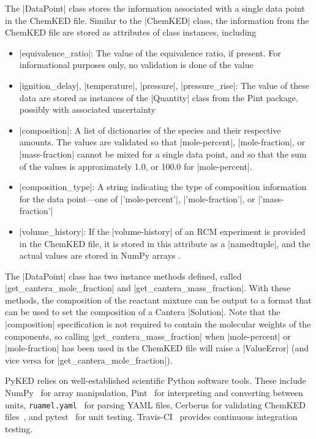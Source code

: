 \documentclass[12pt]{ussci}
\newcommand\ck{ChemKED}
\newcommand\pk{PyKED}
\begin{document}
The \python|DataPoint| class stores the information associated with a single
data point in the \ck{} file. Similar to the \python|ChemKED| class, the
information from the \ck{} file are stored as attributes of class instances,
including
%
\begin{itemize}
    \item \python|equivalence_ratio|: The value of the equivalence ratio, if
    present. For informational purposes only, no validation is done of the value
    \item \python|ignition_delay|, \python|temperature|, \python|pressure|,
    \python|pressure_rise|: The value of these data are stored as instances of
    the \python|Quantity| class from the Pint \autocite{Grecco2016} package,
    possibly with associated uncertainty
    \item \python|composition|: A list of dictionaries of the species and their
    respective amounts. The values are validated so that \yaml|mole-percent|,
    \yaml|mole-fraction|, or \yaml|mass-fraction| cannot be mixed for a single
    data point, and so that the sum of the values is approximately 1.0, or
    100.0 for \yaml|mole-percent|.
    \item \python|composition_type|: A string indicating the type of composition
    information for the data point---one of \python|'mole-percent'|,
    \python|'mole-fraction'|, or \python|'mass-fraction'|
    \item \python|volume_history|: If the \yaml|volume-history| of an RCM
    experiment is provided in the \ck{} file, it is stored in this attribute as
    a \python|namedtuple|, and the actual values are stored in NumPy arrays
    \autocite{vanderWalt:2011np}.
\end{itemize}

The \python|DataPoint| class has two instance methods defined, called
\python|get_cantera_mole_fraction| and \python|get_cantera_mass_fraction|. With
these methods, the composition of the reactant mixture can be output to a format
that can be used to set the composition of a Cantera \python|Solution|. Note
that the \python|composition| specification is not required to contain the
molecular weights of the components, so calling
\python|get_cantera_mass_fraction| when \yaml|mole-percent| or
\yaml|mole-fraction| has been used in the \ck{} file will raise a
\python|ValueError| (and vice versa for \python|get_cantera_mole_fraction|).

\pk{} relies on well-established scientific Python software tools. These include
NumPy~\autocite{vanderWalt:2011np} for array manipulation,
Pint~\autocite{Grecco2016} for interpreting and converting between units,
\texttt{ruamel.yaml}~\autocite{ruamel_yaml} for parsing YAML files, Cerberus for
validating \ck{} files~\autocite{cerberus}, and pytest~\autocite{pytest:3.0.1}
for unit testing. Travis-CI~\autocite{Travis2016} provides continuous
integration testing.
\end{document}
